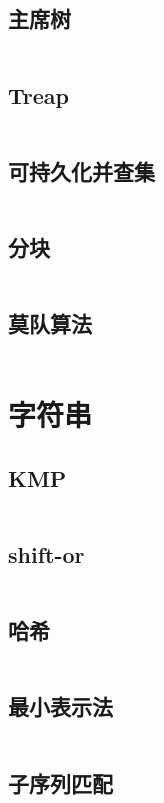 \documentclass[a4paper,6pt]{article}
\begin{document}
\subsection{主席树}
\inputminted[breaklines]{c++}{data-structure/chairman-tree.cpp}
\subsection{Treap}
\inputminted[breaklines]{c++}{data-structure/Treap.cpp}
\subsection{可持久化并查集}
\inputminted[breaklines]{c++}{data-structure/rope-bcj.cpp}
\subsection{分块}
\inputminted[breaklines]{c++}{data-structure/Part_Blocks.cpp}
\subsection{莫队算法}
\inputminted[breaklines]{c++}{data-structure/Mo.cpp}

\newpage
\section{字符串}
\subsection{KMP}
\inputminted[breaklines]{c++}{string/KMP.cpp}
\subsection{shift-or}
\inputminted[breaklines]{c++}{string/shift-or.cpp}
\subsection{哈希}
\inputminted[breaklines]{c++}{string/hash.cpp}
\subsection{最小表示法}
\inputminted[breaklines]{c++}{string/min-represent.cpp}
\subsection{子序列匹配}
\inputminted[breaklines]{c++}{string/subseq.cpp}
\end{document}
